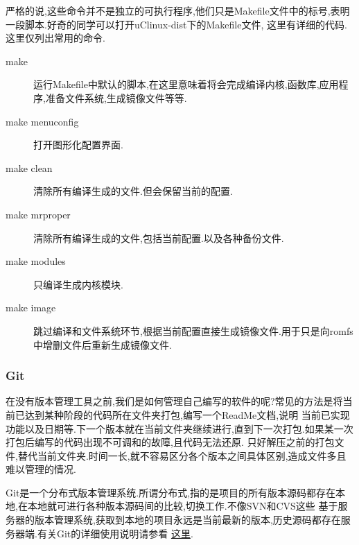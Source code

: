 \documentclass[12pt,a4paper,titlepage]{article}
\begin{document}
严格的说,这些命令并不是独立的可执行程序,他们只是Makefile文件中的标号,表明一段脚本.好奇的同学可以打开uClinux-dist下的Makefile文件,
这里有详细的代码.这里仅列出常用的命令.
\begin{description}
\item[make] 运行Makefile中默认的脚本,在这里意味着将会完成编译内核,函数库,应用程序,准备文件系统,生成镜像文件等等.
\item[make menuconfig] 打开图形化配置界面.
\item[make clean] 清除所有编译生成的文件.但会保留当前的配置.
\item[make mrproper] 清除所有编译生成的文件,包括当前配置.以及各种备份文件.
\item[make modules] 只编译生成内核模块.
\item[make image] 跳过编译和文件系统环节,根据当前配置直接生成镜像文件.用于只是向romfs中增删文件后重新生成镜像文件.
\end{description}
\subsubsection{Git}
在没有版本管理工具之前,我们是如何管理自己编写的软件的呢?常见的方法是将当前已达到某种阶段的代码所在文件夹打包,编写一个ReadMe文档,说明
当前已实现功能以及日期等.下一个版本就在当前文件夹继续进行,直到下一次打包.如果某一次打包后编写的代码出现不可调和的故障,且代码无法还原.
只好解压之前的打包文件,替代当前文件夹.时间一长,就不容易区分各个版本之间具体区别,造成文件多且难以管理的情况.

Git是一个分布式版本管理系统.所谓分布式,指的是项目的所有版本源码都存在本地,在本地就可进行各种版本源码间的比较,切换工作.不像SVN和CVS这些
基于服务器的版本管理系统,获取到本地的项目永远是当前最新的版本,历史源码都存在服务器端.有关Git的详细使用说明请参看
\href{http://progit.org/book/}{这里}.
\end{document}
